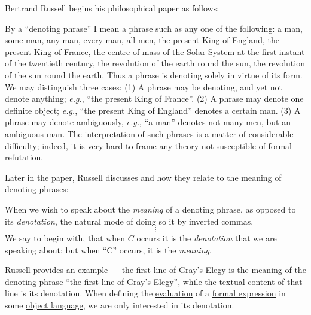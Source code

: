 \begin{concept}\label{con:description_operator}
  Bertrand Russell begins his philosophical paper \cite{Russell1905OnDenoting} as follows:
  \begin{displayquote}
    By a \enquote{denoting phrase} I mean a phrase such as any one of the following: a man, some man, any man, every man, all men, the present King of England, the present King of France, the centre of mass of the Solar System at the first instant of the twentieth century, the revolution of the earth round the sun, the revolution of the sun round the earth. Thus a phrase is denoting solely in virtue of its form. We may distinguish three cases: (1) A phrase may be denoting, and yet not denote anything; \textit{e.g.}, \enquote{the present King of France}. (2) A phrase may denote one definite object; \textit{e.g.}, \enquote{the present King of England} denotes a certain man. (3) A phrase may denote ambiguously, \textit{e.g.}, \enquote{a man} denotes not many men, but an ambiguous man. The interpretation of such phrases is a matter of considerable difficulty; indeed, it is very hard to frame any theory not susceptible of formal refutation.
  \end{displayquote}

  Later in the paper, Russell discusses  and how they relate to the meaning of denoting phrases:
  \begin{displayquote}
    When we wish to speak about the \textit{meaning} of a denoting phrase, as opposed to its \textit{denotation}, the natural mode of doing so it by inverted commas.
    \begin{equation*}
      \vdots
    \end{equation*}
    We say to begin with, that when \( C \) occurs it is the \textit{denotation} that we are speaking about; but when \enquote{C} occurs, it is the \textit{meaning}.
  \end{displayquote}

  Russell provides an example --- the first line of Gray's Elegy is the meaning of the denoting phrase \enquote{the first line of Gray's Elegy}, while the textual content of that line is its denotation. When defining the \hyperref[con:evaluation]{evaluation} of a \hyperref[con:expression]{formal expression} in some \hyperref[con:metalogic]{object language}, we are only interested in its denotation.


\end{concept}
